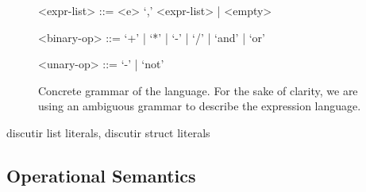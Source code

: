 {\begin{figure}[!ht]
\begin{mdframed}[outermargin=0.2cm, innermargin=0.5cm]
\begin{grammar}
<expr-list> ::= <e> `,' <expr-list> | <empty>  

<binary-op> ::= `+' | `*' | `-' | `/' | `and' | `or'

<unary-op> ::= `-' | `not'

\end{grammar}
\end{mdframed}
\caption{Concrete grammar of the language. For the sake of clarity, we are using an ambiguous grammar to describe the expression language.} \label{fig:dsl-grammar}
\end{figure}
}

discutir list literals, discutir struct literals




\subsection{Operational Semantics} \label{sec:operational-semantic}

